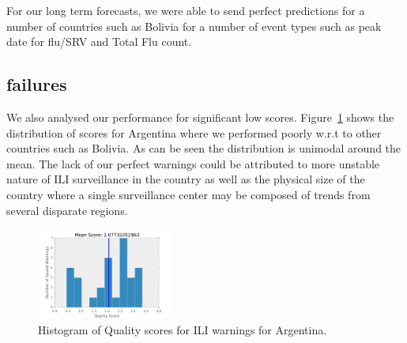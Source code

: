 For our long term forecasts, we were able to send perfect predictions for a 
number of countries such as Bolivia for a number of event types such as 
peak date for flu/SRV and Total Flu count.

\subsection{failures}

We also analysed our performance for significant low scores. 
Figure~\ref{fig:ili_hist:arg} shows the distribution of scores for Argentina where
we performed poorly w.r.t to other countries such as Bolivia. As can be seen the 
distribution is unimodal around the mean. The lack of our perfect warnings
could be attributed to more unstable nature of ILI surveillance in the country as
well as the physical size of the country where a single surveillance 
center may be composed of trends from several disparate regions.

\begin{figure}
  \includegraphics[width=0.4\textwidth]{../figures/ili/Failure_Argentina.pdf}
  \caption{\label{fig:ili_hist:arg}Histogram of Quality scores for ILI warnings
  for Argentina.}
\end{figure}


